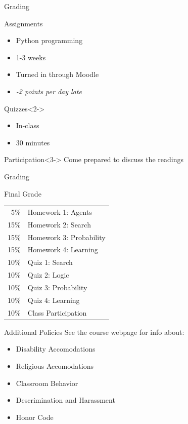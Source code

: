 \documentclass[12pt]{beamer}
\begin{document}
\begin{frame}{Grading}
	\begin{block}{Assignments}
		\begin{itemize}
			\item Python programming
			\item 1-3 weeks
			\item Turned in through Moodle
			\item \textit{-2 points per day late}
		\end{itemize}
	\end{block}
	\begin{block}{Quizzes}<2->
		\begin{itemize}
			\item In-class
			\item 30 minutes
		\end{itemize}
	\end{block}
	\begin{block}{Participation}<3->
		Come prepared to discuss the readings
	\end{block}
\end{frame}

\begin{frame}{Grading}
	\begin{block}{Final Grade}
		\begin{tabular}{rl}
		  5\% & Homework 1: Agents \\
		 15\% & Homework 2: Search \\
		 15\% & Homework 3: Probability \\
		 15\% & Homework 4: Learning \\
		 10\% & Quiz 1: Search \\
		 10\% & Quiz 2: Logic \\
		 10\% & Quiz 3: Probability \\
		 10\% & Quiz 4: Learning \\
		 10\% & Class Participation \\
		\end{tabular}
	\end{block}
\end{frame}

\begin{frame}{Additional Policies}
	See the course webpage for info about:
	\begin{itemize}
		\item Disability Accomodations
		\item Religious Accomodations
		\item Classroom Behavior
		\item Descrimination and Harassment
		\item \alert<2->{Honor Code}
	\end{itemize}
\end{frame}
\end{document}

